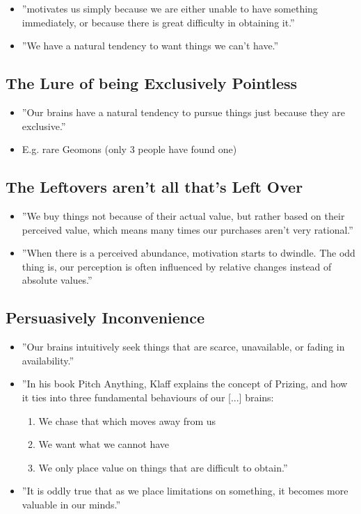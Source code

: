 \begin{itemize}
    \item ''motivates us simply because we are either unable to have something immediately, or because there is great difficulty in obtaining it.''
    \item ''We have a natural tendency to want things we can't have.''
\end{itemize}

\subsection{The Lure of being Exclusively Pointless}
\begin{itemize}
    \item ''Our brains have a natural tendency to pursue things just because they are exclusive.''
    \item E.g. rare Geomons (only 3 people have found one)
\end{itemize}

\subsection{The Leftovers aren't all that's Left Over}
\begin{itemize}
    \item ''We buy things not because of their actual value, but rather based on their perceived value, which means many times our purchases aren't very rational.''
    \item ''When there is a perceived abundance, motivation starts to dwindle. The odd thing is, our perception is often influenced by relative changes instead of absolute values.''
\end{itemize}

\subsection{Persuasively Inconvenience}
\begin{itemize}
    \item ''Our brains intuitively seek things that are scarce, unavailable, or fading in availability.''
    \item ''In his book Pitch Anything, Klaff explains the concept of Prizing, and how it ties into three fundamental behaviours of our [...] brains:
    \begin{enumerate}
        \item We chase that which moves away from us
        \item We want what we cannot have
        \item We only place value on things that are difficult to obtain.''
    \end{enumerate}
    \item ''It is oddly true that as we place limitations on something, it becomes more valuable in our minds.''
\end{itemize}

